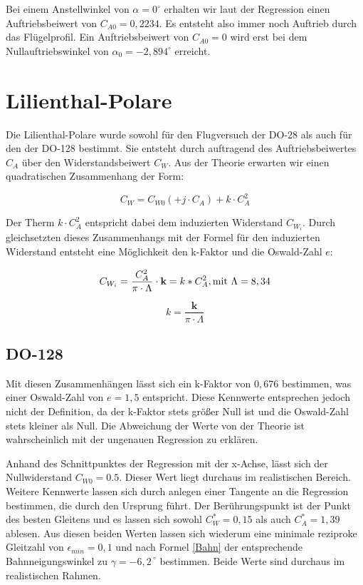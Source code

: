 Bei einem Anstellwinkel von $\alpha = 0^{\circ}$ erhalten wir laut der Regression einen Auftriebsbeiwert von $C_{A0} = 0,2234$. Es entsteht also immer noch Auftrieb durch das Flügelprofil. 
Ein Auftriebsbeiwert von $C_{A0} = 0$ wird erst bei dem Nullauftriebswinkel von $\alpha_0 = -2,894^{\circ}$ erreicht.

\section{Lilienthal-Polare}
Die Lilienthal-Polare wurde sowohl für den Flugversuch der DO-28 als auch für den der DO-128 bestimmt. Sie entsteht durch auftragend des Auftriebsbeiwertes $C_A$ über den Widerstandsbeiwert $C_W$. 
Aus der Theorie erwarten wir einen quadratischen Zusammenhang der Form:

\begin{equation}
C_W = C_{W0} (+ j \cdot C_A) + k \cdot C_{A}^2
\end{equation}

Der Therm $k \cdot C_{A}^2$ entspricht dabei dem induzierten Widerstand $C_{W_i}$. Durch gleichsetzten dieses Zusammenhangs mit der Formel für den induzierten Widerstand entsteht eine Möglichkeit den k-Faktor und die Oswald-Zahl $e$:

\begin{equation}
C_{W_{i}}=\frac{C_A^2}{\pi \cdot \Lambda}\cdot \textbf{k}=k*C_A^2, \\ \mathrm{mit} \ \Lambda=8,34 
\label{eq:C_W_i}
\end{equation}

\begin{equation}
k = \frac{\textbf{k}}{\pi \cdot \Lambda}
\end{equation}

\subsection{DO-128}

Mit diesen Zusammenhängen lässt sich ein k-Faktor von $0,676$ bestimmen, was einer Oswald-Zahl von $e = 1,5$ entspricht. Diese Kennwerte entsprechen jedoch nicht der Definition, da der k-Faktor stets größer Null ist und die Oswald-Zahl stets kleiner als Null. Die Abweichung der Werte von der Theorie ist wahrscheinlich mit der ungenauen Regression zu erklären.

Anhand des Schnittpunktes der Regression mit der x-Achse, lässt sich der Nullwiderstand $C_{W0} = 0.5$. Dieser Wert liegt durchaus im realistischen Bereich. Weitere Kennwerte lassen sich durch anlegen einer Tangente an die Regression bestimmen, die durch den Ursprung führt. Der Berührungspunkt ist der Punkt des besten Gleitens und es lassen sich sowohl $C_W^* = 0,15$ als auch $C_A^* = 1,39$ ablesen. Aus diesen beiden Werten lassen sich wiederum eine minimale reziproke Gleitzahl von $\epsilon_{min} = 0,1$ und nach Formel \ref{Bahn} der entsprechende Bahnneigungswinkel zu $\gamma=-6,2^{\ \circ}$ bestimmen. Beide Werte sind durchaus im realistischen Rahmen.

